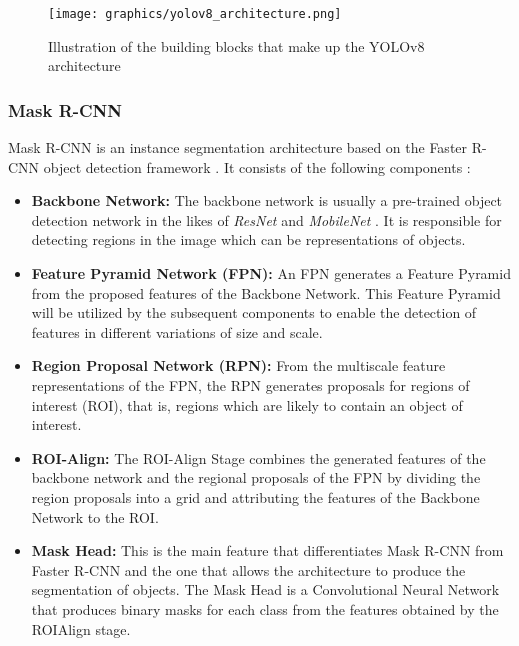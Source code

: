\documentclass[draft,final]{vutinfth} %
\begin{document}
\begin{figure}
    \centering
    \texttt{[image: graphics/yolov8\_architecture.png]}
    \caption{Illustration of the building blocks that make up the YOLOv8 architecture \cite{yao_hp-yolov8_2024}}
    \label{fig:yolov8_architecture}
\end{figure}

\subsubsection{Mask R-CNN} \label{sec:method_maskrcnn}
Mask R-CNN is an instance segmentation architecture based on the Faster R-CNN object detection framework \cite{ren_faster_2016}. It consists of the following components \cite{he_mask_2018, potrimba_what_2023}:

\begin{itemize}
    \item \textbf{Backbone Network:} The backbone network is usually a pre-trained object detection network in the likes of \textit{ResNet} \cite{he_deep_2015} and \textit{MobileNet} \cite{howard_mobilenets_2017}. It is responsible for detecting regions in the image which can be representations of objects.
    \item \textbf{Feature Pyramid Network (FPN):} An FPN generates a Feature Pyramid from the proposed features of the Backbone Network. This Feature Pyramid will be utilized by the subsequent components to enable the detection of features in different variations of size and scale.
    \item \textbf{Region Proposal Network (RPN):} From the multiscale feature representations of the FPN, the RPN generates proposals for regions of interest (ROI), that is, regions which are likely to contain an object of interest.
    \item \textbf{ROI-Align:} The ROI-Align Stage combines the generated features of the backbone network and the regional proposals of the FPN by dividing the region proposals into a grid and attributing the features of the Backbone Network to the ROI.
    \item \textbf{Mask Head:} This is the main feature that differentiates Mask R-CNN from Faster R-CNN and the one that allows the architecture to produce the segmentation of objects. The Mask Head is a Convolutional Neural Network that produces binary masks for each class from the features obtained by the ROIAlign stage.
\end{itemize}
\end{document}
